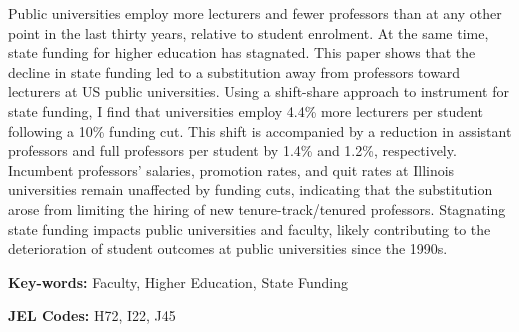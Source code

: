 Public universities employ more lecturers and fewer professors than at any other point in the last thirty years, relative to student enrolment.
At the same time, state funding for higher education has stagnated.
This paper shows that the decline in state funding led to a substitution away from professors toward lecturers at US public universities.
Using a shift-share approach to instrument for state funding, I find that universities employ 4.4\% more lecturers per student following a 10\% funding cut.
This shift is accompanied by a reduction in assistant professors and full professors per student by 1.4\% and 1.2\%, respectively.
Incumbent professors' salaries, promotion rates, and quit rates at Illinois universities remain unaffected by funding cuts, indicating that the substitution arose from limiting the hiring of new tenure-track/tenured professors.
Stagnating state funding impacts public universities and faculty, likely contributing to the deterioration of student outcomes at public universities since the 1990s.

\vfill
\noindent
\textbf{Key-words:}
Faculty,
Higher Education,
State Funding

\vspace{0.05cm}
\noindent
\textbf{JEL Codes:} H72, I22, J45
